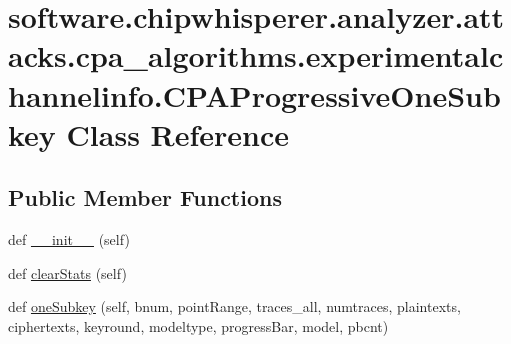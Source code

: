 \hypertarget{classsoftware_1_1chipwhisperer_1_1analyzer_1_1attacks_1_1cpa__algorithms_1_1experimentalchannelinfo_1_1CPAProgressiveOneSubkey}{}\section{software.\+chipwhisperer.\+analyzer.\+attacks.\+cpa\+\_\+algorithms.\+experimentalchannelinfo.\+C\+P\+A\+Progressive\+One\+Subkey Class Reference}
\label{classsoftware_1_1chipwhisperer_1_1analyzer_1_1attacks_1_1cpa__algorithms_1_1experimentalchannelinfo_1_1CPAProgressiveOneSubkey}
\subsection*{Public Member Functions}
\begin{DoxyCompactItemize}
\item 
def \hyperlink{classsoftware_1_1chipwhisperer_1_1analyzer_1_1attacks_1_1cpa__algorithms_1_1experimentalchannelinfo_1_1CPAProgressiveOneSubkey_a5114a559ab0f113e49ece86bc78c81a9}{\+\_\+\+\_\+init\+\_\+\+\_\+} (self)
\item 
def \hyperlink{classsoftware_1_1chipwhisperer_1_1analyzer_1_1attacks_1_1cpa__algorithms_1_1experimentalchannelinfo_1_1CPAProgressiveOneSubkey_a25ffd8676b7d5df3f1ae8b0ecc404cd7}{clear\+Stats} (self)
\item 
def \hyperlink{classsoftware_1_1chipwhisperer_1_1analyzer_1_1attacks_1_1cpa__algorithms_1_1experimentalchannelinfo_1_1CPAProgressiveOneSubkey_add306183e4bf6f9a9c6605166a02c58b}{one\+Subkey} (self, bnum, point\+Range, traces\+\_\+all, numtraces, plaintexts, ciphertexts, keyround, modeltype, progress\+Bar, model, pbcnt)
\end{DoxyCompactItemize}
